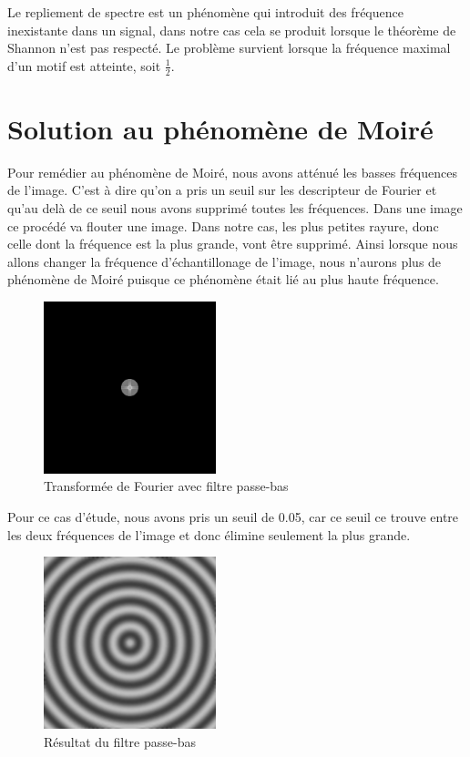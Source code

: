 \documentclass[a4paper,11pt]{article}
\begin{document}
  Le repliement de spectre est un phénomène qui introduit des fréquence inexistante dans un signal, dans notre cas cela se produit lorsque le théorème de Shannon n’est pas respecté.
  Le problème survient lorsque la fréquence maximal d’un motif est atteinte, soit $\frac{1}{2}$.\\

  \section{Solution au phénomène de Moiré}
  
  Pour remédier au phénomène de Moiré, nous avons atténué les basses fréquences de l'image. C'est à dire qu'on a pris un
  seuil sur les descripteur de Fourier et qu'au delà de ce seuil nous avons supprimé toutes les fréquences. Dans une image
  ce procédé va flouter une image. Dans notre cas, les plus petites rayure, donc celle dont la fréquence est la plus grande,
  vont être supprimé. Ainsi lorsque nous allons changer la fréquence d'échantillonage de l'image, nous n'aurons plus de phénomène
  de Moiré puisque ce phénomène était lié au plus haute fréquence.\\
  
  \begin{figure}[H]
  \center
   \includegraphics[width=5cm]{../FFT_1024_moire.png}
   \caption{Transformée de Fourier avec filtre passe-bas}
  \end{figure}
  
  Pour ce cas d'étude, nous avons pris un seuil de 0.05, car ce seuil ce trouve entre les deux fréquences de l'image et donc 
  élimine seulement la plus grande.
  
  \begin{figure}[H]
  \center
   \includegraphics[width=5cm]{../1024_moire_hf.png}
   \caption{Résultat du filtre passe-bas}
  \end{figure}
  
\end{document}
